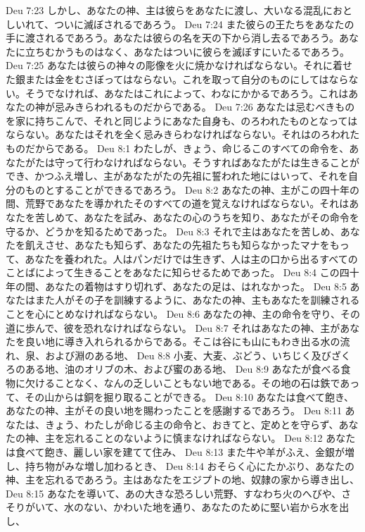 Deu 7:23  しかし、あなたの神、主は彼らをあなたに渡し、大いなる混乱におとしいれて、ついに滅ぼされるであろう。
Deu 7:24  また彼らの王たちをあなたの手に渡されるであろう。あなたは彼らの名を天の下から消し去るであろう。あなたに立ちむかうものはなく、あなたはついに彼らを滅ぼすにいたるであろう。
Deu 7:25  あなたは彼らの神々の彫像を火に焼かなければならない。それに着せた銀または金をむさぼってはならない。これを取って自分のものにしてはならない。そうでなければ、あなたはこれによって、わなにかかるであろう。これはあなたの神が忌みきらわれるものだからである。
Deu 7:26  あなたは忌むべきものを家に持ちこんで、それと同じようにあなた自身も、のろわれたものとなってはならない。あなたはそれを全く忌みきらわなければならない。それはのろわれたものだからである。
Deu 8:1  わたしが、きょう、命じるこのすべての命令を、あなたがたは守って行わなければならない。そうすればあなたがたは生きることができ、かつふえ増し、主があなたがたの先祖に誓われた地にはいって、それを自分のものとすることができるであろう。
Deu 8:2  あなたの神、主がこの四十年の間、荒野であなたを導かれたそのすべての道を覚えなければならない。それはあなたを苦しめて、あなたを試み、あなたの心のうちを知り、あなたがその命令を守るか、どうかを知るためであった。
Deu 8:3  それで主はあなたを苦しめ、あなたを飢えさせ、あなたも知らず、あなたの先祖たちも知らなかったマナをもって、あなたを養われた。人はパンだけでは生きず、人は主の口から出るすべてのことばによって生きることをあなたに知らせるためであった。
Deu 8:4  この四十年の間、あなたの着物はすり切れず、あなたの足は、はれなかった。
Deu 8:5  あなたはまた人がその子を訓練するように、あなたの神、主もあなたを訓練されることを心にとめなければならない。
Deu 8:6  あなたの神、主の命令を守り、その道に歩んで、彼を恐れなければならない。
Deu 8:7  それはあなたの神、主があなたを良い地に導き入れられるからである。そこは谷にも山にもわき出る水の流れ、泉、および淵のある地、
Deu 8:8  小麦、大麦、ぶどう、いちじく及びざくろのある地、油のオリブの木、および蜜のある地、
Deu 8:9  あなたが食べる食物に欠けることなく、なんの乏しいこともない地である。その地の石は鉄であって、その山からは銅を掘り取ることができる。
Deu 8:10  あなたは食べて飽き、あなたの神、主がその良い地を賜わったことを感謝するであろう。
Deu 8:11  あなたは、きょう、わたしが命じる主の命令と、おきてと、定めとを守らず、あなたの神、主を忘れることのないように慎まなければならない。
Deu 8:12  あなたは食べて飽き、麗しい家を建てて住み、
Deu 8:13  また牛や羊がふえ、金銀が増し、持ち物がみな増し加わるとき、
Deu 8:14  おそらく心にたかぶり、あなたの神、主を忘れるであろう。主はあなたをエジプトの地、奴隷の家から導き出し、
Deu 8:15  あなたを導いて、あの大きな恐ろしい荒野、すなわち火のへびや、さそりがいて、水のない、かわいた地を通り、あなたのために堅い岩から水を出し、
